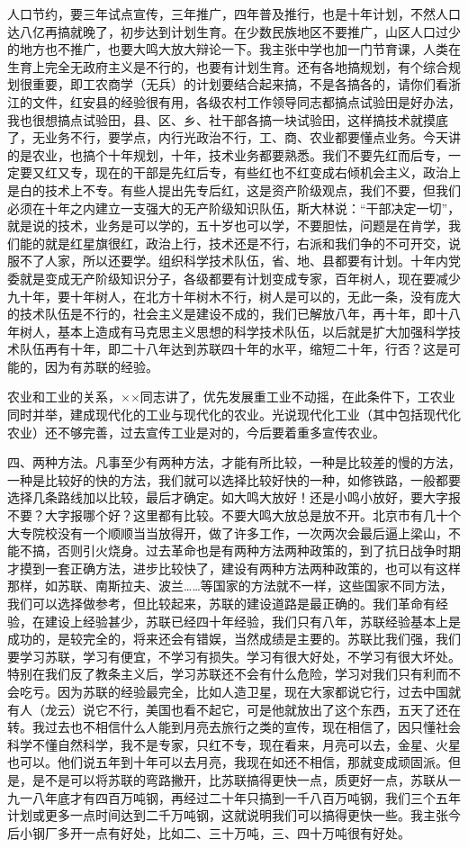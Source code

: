 人口节约，要三年试点宣传，三年推广，四年普及推行，也是十年计划，不然人口达八亿再搞就晚了，初步达到计划生育。在少数民族地区不要推广，山区人口过少的地方也不推广，也要大鸣大放大辩论一下。我主张中学也加一门节育课，人类在生育上完全无政府主义是不行的，也要有计划生育。还有各地搞规划，有个综合规划很重要，即工农商学（无兵）的计划要结合起来搞，不是各搞各的，请你们看浙江的文件，红安县的经验很有用，各级农村工作领导同志都搞点试验田是好办法，我也很想搞点试验田，县、区、乡、社干部各搞一块试验田，这样搞技术就摸底了，无业务不行，要学点，内行光政治不行，工、商、农业都要懂点业务。今天讲的是农业，也搞个十年规划，十年，技术业务都要熟悉。我们不要先红而后专，一定要又红又专，现在的干部是先红后专，有些红也不红变成右倾机会主义，政治上是白的技术上不专。有些人提出先专后红，这是资产阶级观点，我们不要，但我们必须在十年之内建立一支强大的无产阶级知识队伍，斯大林说：“干部决定一切”，就是说的技术，业务是可以学的，五十岁也可以学，不要胆怯，问题是在肯学，我们能的就是红星旗很红，政治上行，技术还是不行，右派和我们争的不可开交，说服不了人家，所以还要学。组织科学技术队伍，省、地、县都要有计划。十年内党委就是变成无产阶级知识分子，各级都要有计划变成专家，百年树人，现在要减少九十年，要十年树人，在北方十年树木不行，树人是可以的，无此一条，没有庞大的技术队伍是不行的，社会主义是建设不成的，我们已解放八年，再十年，即十八年树人，基本上造成有马克思主义思想的科学技术队伍，以后就是扩大加强科学技术队伍再有十年，即二十八年达到苏联四十年的水平，缩短二十年，行否？这是可能的，因为有苏联的经验。

农业和工业的关系，××同志讲了，优先发展重工业不动摇，在此条件下，工农业同时并举，建成现代化的工业与现代化的农业。光说现代化工业（其中包括现代化农业）还不够完善，过去宣传工业是对的，今后要着重多宣传农业。

四、两种方法。凡事至少有两种方法，才能有所比较，一种是比较差的慢的方法，一种是比较好的快的方法，我们就可以选择比较好快的一种，如修铁路，一般都要选择几条路线加以比较，最后才确定。如大鸣大放好！还是小鸣小放好，要大字报不要？大字报哪个好？这里都有比较。不要大鸣大放总是放不开。北京市有几十个大专院校没有一个顺顺当当放得开，做了许多工作，一次两次会最后逼上梁山，不能不搞，否则引火烧身。过去革命也是有两种方法两种政策的，到了抗日战争时期才摸到一套正确方法，进步比较快了，建设有两种方法两种政策的，也可以有这样那样，如苏联、南斯拉夫、波兰……等国家的方法就不一样，这些国家不同方法，我们可以选择做参考，但比较起来，苏联的建设道路是最正确的。我们革命有经验，在建设上经验甚少，苏联已经四十年经验，我们只有八年，苏联经验基本上是成功的，是较完全的，将来还会有错娱，当然成绩是主要的。苏联比我们强，我们要学习苏联，学习有便宜，不学习有损失。学习有很大好处，不学习有很大坏处。特别在我们反了教条主义后，学习苏联还不会有什么危险，学习对我们只有利而不会吃亏。因为苏联的经验最完全，比如人造卫星，现在大家都说它行，过去中国就有人（龙云）说它不行，美国也看不起它，可是他就放出了这个东西，五天了还在转。我过去也不相信什么人能到月亮去旅行之类的宣传，现在相信了，因只懂社会科学不懂自然科学，我不是专家，只红不专，现在看来，月亮可以去，金星、火星也可以。他们说五年到十年可以去月亮，我现在如还不相信，那就变成顽固派。但是，是不是可以将苏联的弯路撇开，比苏联搞得更快一点，质更好一点，苏联从一九一八年底才有四百万吨钢，再经过二十年只搞到一千八百万吨钢，我们三个五年计划或更多一点时间达到二千万吨钢，这就说明我们可以搞得更快一些。我主张今后小钢厂多开一点有好处，比如二、三十万吨，三、四十万吨很有好处。


